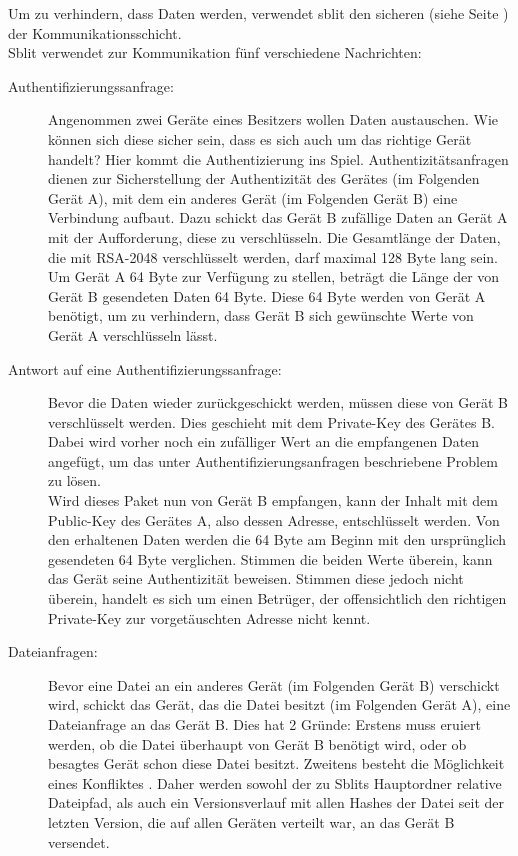 Um zu verhindern, dass Daten werden, verwendet sblit den sicheren  (siehe Seite \pageref{Applicationchannel}) der Kommunikationsschicht.\\
Sblit verwendet zur Kommunikation fünf verschiedene Nachrichten:
\begin{description}
	\item [{Authentifizierungssanfrage:}]
		Angenommen zwei Geräte eines Besitzers wollen Daten austauschen. Wie können sich diese sicher sein, dass es sich auch um das richtige Gerät handelt? Hier kommt die Authentizierung ins Spiel. Authentizitätsanfragen dienen zur Sicherstellung der Authentizität des Gerätes (im 	Folgenden Gerät A), mit dem ein anderes Gerät (im Folgenden Gerät B) eine Verbindung aufbaut. Dazu schickt das Gerät B zufällige Daten an Gerät A mit der Aufforderung, diese zu verschlüsseln. Die Gesamtlänge der Daten, die mit RSA-2048 verschlüsselt werden, darf maximal 128 Byte lang sein. Um Gerät A 64 Byte zur Verfügung zu stellen, beträgt die Länge der von Gerät B gesendeten Daten 64 Byte. Diese 64 Byte werden von Gerät A benötigt, um zu verhindern, dass Gerät B sich gewünschte Werte von Gerät A verschlüsseln lässt.

	\item [{Antwort auf eine Authentifizierungssanfrage:}]
		Bevor die Daten wieder zurückgeschickt werden, müssen diese von Gerät B verschlüsselt werden. Dies geschieht mit dem Private-Key des Gerätes B. Dabei wird vorher noch ein zufälliger Wert an die empfangenen Daten angefügt, um das unter Authentifizierungsanfragen beschriebene Problem zu lösen.\\
		Wird dieses Paket nun von Gerät B empfangen, kann der Inhalt mit dem Public-Key des Gerätes A, also dessen Adresse, entschlüsselt werden. Von den erhaltenen Daten werden die 64 Byte am Beginn mit den ursprünglich gesendeten 64 Byte verglichen. Stimmen die beiden Werte überein, kann das Gerät seine Authentizität beweisen. Stimmen diese jedoch nicht überein, handelt es sich um einen Betrüger, der offensichtlich den richtigen Private-Key zur vorgetäuschten Adresse nicht kennt.
		
	\item [{Dateianfragen:}] \label{Dateianfrage}
		Bevor eine Datei an ein anderes Gerät (im Folgenden Gerät B) verschickt wird, schickt das Gerät, das die Datei besitzt (im Folgenden Gerät A), eine Dateianfrage an das Gerät B. Dies hat 2 Gründe: Erstens muss eruiert werden, ob die Datei überhaupt von Gerät B benötigt wird, oder ob besagtes Gerät schon diese Datei besitzt. Zweitens besteht die Möglichkeit eines Konfliktes . Daher werden sowohl der zu Sblits Hauptordner relative Dateipfad, als auch ein Versionsverlauf mit allen Hashes der Datei seit der letzten Version, die auf allen Geräten verteilt war, an das Gerät B versendet. 
		

\end{description}
